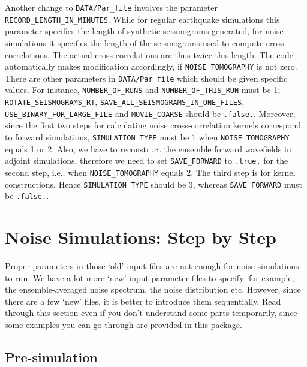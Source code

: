 \documentclass[oneside,english]{book}
\begin{document}
Another change to \texttt{DATA/Par\_file} involves the parameter \texttt{RECORD\_LENGTH\_IN\_MINUTES}.
While for regular earthquake simulations this parameter specifies the length of synthetic seismograms generated,
for noise simulations it specifies the length of the seismograms used to compute cross correlations.
The actual cross correlations are thus twice this length.
The code automatically makes modification accordingly, if \texttt{NOISE\_TOMOGRAPHY} is not zero.\\

There are other parameters in \texttt{DATA/Par\_file} which should be given specific values.
For instance, \texttt{NUMBER\_OF\_RUNS} and \texttt{NUMBER\_OF\_THIS\_RUN} must be 1;
\texttt{ROTATE\_SEISMOGRAMS\_RT}, \texttt{SAVE\_ALL\_SEISMOGRAMS\_IN\_ONE\_FILES},
\texttt{USE\_BINARY\_FOR\_LARGE\_FILE} and \texttt{MOVIE\_COARSE} should be \texttt{.false.}.
Moreover, since the first two steps for calculating noise cross-correlation kernels correspond to
forward simulations, \texttt{SIMULATION\_TYPE} must be 1 when \texttt{NOISE\_TOMOGRAPHY} equals 1 or 2.
Also, we have to reconstruct the ensemble forward wavefields in adjoint simulations,
therefore we need to set \texttt{SAVE\_FORWARD} to \texttt{.true.} for the second step,
i.e., when \texttt{NOISE\_TOMOGRAPHY} equals 2.
The third step is for kernel constructions. Hence \texttt{SIMULATION\_TYPE} should be 3, whereas
\texttt{SAVE\_FORWARD} must be \texttt{.false.}.\\


\section{Noise Simulations: Step by Step}

Proper parameters in those `old' input files are not enough for noise simulations to run.
We have a lot more `new' input parameter files to specify:
for example, the ensemble-averaged noise spectrum, the noise distribution etc.
However, since there are a few `new' files, it is better to introduce them sequentially.
Read through this section even if you don't understand some parts temporarily,
since some examples you can go through are provided in this package.

\subsection{Pre-simulation}
\end{document}
